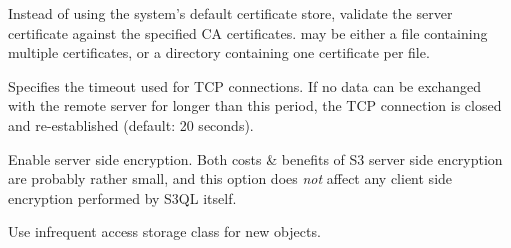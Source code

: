 \documentclass[letterpaper,10pt,english]{sphinxmanual}
\begin{document}

\begin{fulllineitems}
\label{backends:cmdoption-s3_backend-arg-ssl-ca-path}
Instead of using the system's default certificate store, validate
the server certificate against the specified CA
certificates.  may be either a file containing
multiple certificates, or a directory containing one certificate
per file.

\end{fulllineitems}


\begin{fulllineitems}
\label{backends:cmdoption-s3_backend-arg-tcp-timeout}
Specifies the timeout used for TCP connections. If no data can be
exchanged with the remote server for longer than this period, the
TCP connection is closed and re-established (default: 20 seconds).

\end{fulllineitems}


\begin{fulllineitems}
\label{backends:cmdoption-s3_backend-arg-sse}
Enable server side encryption. Both costs \& benefits of S3 server
side encryption are probably rather small, and this option does
\emph{not} affect any client side encryption performed by S3QL itself.

\end{fulllineitems}


\begin{fulllineitems}
\label{backends:cmdoption-s3_backend-arg-ia}
Use infrequent access storage class for new objects.

\end{fulllineitems}

\end{document}
